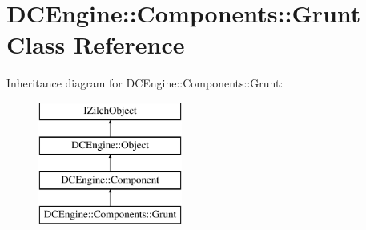 \hypertarget{classDCEngine_1_1Components_1_1Grunt}{\section{D\-C\-Engine\-:\-:Components\-:\-:Grunt Class Reference}
\label{classDCEngine_1_1Components_1_1Grunt}
}
Inheritance diagram for D\-C\-Engine\-:\-:Components\-:\-:Grunt\-:\begin{figure}[H]
\begin{center}
\leavevmode
\includegraphics[height=4.000000cm]{classDCEngine_1_1Components_1_1Grunt}
\end{center}
\end{figure}
